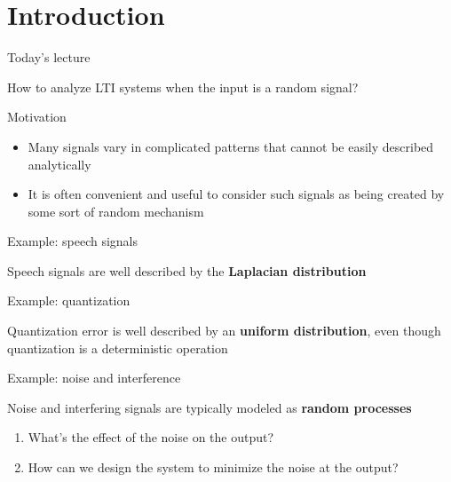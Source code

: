\documentclass[10pt, handout]{beamer}
\begin{document}
\section{Introduction}
\begin{frame}{Today's lecture} 

How to analyze LTI systems when the input is a random signal?

\begin{block}{Motivation}
	\begin{itemize}
		\item Many signals vary in complicated patterns that
		cannot be easily described analytically
		\item It is often convenient and useful to consider
		such signals as being created by some sort of
		random mechanism
	\end{itemize}   	
\end{block}
\end{frame}

%
\begin{frame}{Example: speech signals}

Speech signals are well described by the \textbf{Laplacian distribution}

\begin{figure}
	\centering
	\resizebox{\linewidth}{!}{}
	\label{fig:speech_and_dist}
\end{figure} 

\end{frame}


%
\begin{frame}{Example: quantization}

Quantization error is well described by an \textbf{uniform distribution}, even though quantization is a deterministic operation 
\vspace{-0.6cm}
\begin{center}
	\resizebox{\linewidth}{!}{}
\end{center}


\end{frame}

%
\begin{frame}{Example: noise and interference}

Noise and interfering signals are typically modeled as \textbf{random processes}

\begin{enumerate}
	\item What's the effect of the noise on the output? 
	\item How can we design the system to minimize the noise at the output?	
\end{enumerate}

\begin{figure}
	\centering
	\resizebox{\linewidth}{!}{}
\end{figure} 
\end{frame}
\end{document}

